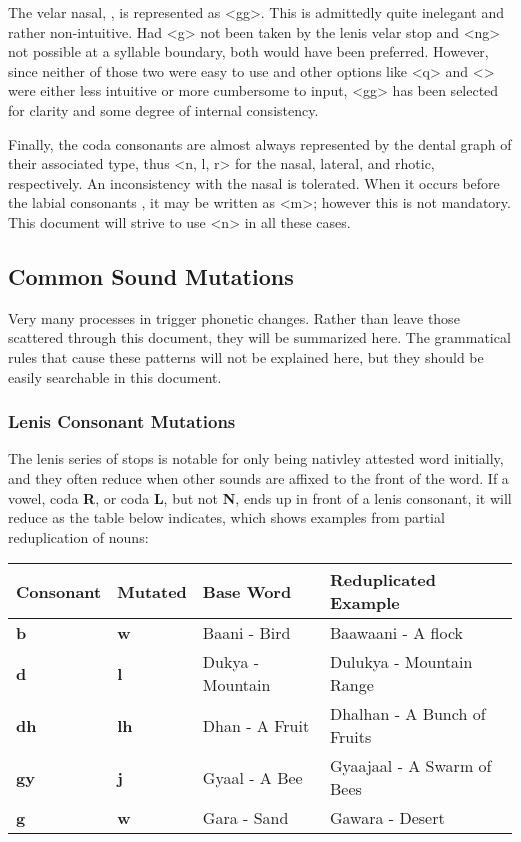   The velar nasal, \phonemic{\engma}, is represented as <gg>. This is admittedly quite inelegant and rather non-intuitive. Had <g> not been taken by the lenis velar stop and <ng> not possible at a syllable boundary, both would have been preferred. However, since neither of those two were easy to use and other options like <q> and <> were either less intuitive or more cumbersome to input, <gg> has been selected for clarity and some degree of internal consistency.\par
  Finally, the coda consonants are almost always represented by the dental graph of their associated type, thus <n, l, r> for the nasal, lateral, and rhotic, respectively. An inconsistency with the nasal is tolerated. When it occurs before the labial consonants , it may be written as <m>; however this is not mandatory. This document will strive to use <n> in all these cases.\par

  \subsection{Common Sound Mutations}
  Very many processes in \langname trigger phonetic changes. Rather than leave those scattered through this document, they will be summarized here. The grammatical rules that cause these patterns will not be explained here, but they should be easily searchable in this document.

  \subsubsection{Lenis Consonant Mutations}
  The lenis series of stops is notable for only being nativley attested word initially, and they often reduce when other sounds are affixed to the front of the word. If a vowel, coda \textbf{R}, or coda \textbf{L}, but not \textbf{N}, ends up in front of a lenis consonant, it will reduce as the table below indicates, which shows examples from partial reduplication of nouns:

  \vertspace
  \begin{tabular}{|l|l|l|l|}
    \hline
    Consonant   & Mutated     & Base Word        & Reduplicated Example         \\ \hline \hline
    \textbf{b}  & \textbf{w}  & Baani - Bird     & Baawaani - A flock           \\
    \textbf{d}  & \textbf{l}  & Dukya - Mountain & Dulukya  - Mountain Range    \\
    \textbf{dh} & \textbf{lh} & Dhan  - A Fruit  & Dhalhan   - A Bunch of Fruits \\
    \textbf{gy} & \textbf{j}  & Gyaal - A Bee    & Gyaajaal - A Swarm of Bees   \\
    \textbf{g}  & \textbf{w}  & Gara  - Sand     & Gawara   - Desert            \\ \hline
  \end{tabular}

